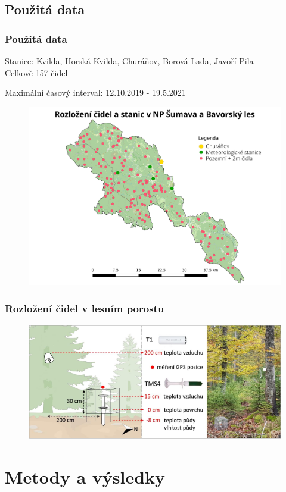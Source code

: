 \documentclass[
	11pt, %
]{beamer}
\begin{document}

\subsection{Použitá data}

\begin{frame}
	\frametitle{Použitá data}
	Stanice: Kvilda, Horská Kvilda, Churáňov, Borová Lada, Javoří Pila\\
	Celkově 157 čidel

	Maximální časový interval: 12.10.2019 - 19.5.2021
	\begin{figure}
		\includegraphics[width=0.7\linewidth]{rozlozenicidel.pdf}
	\end{figure}
\end{frame}

\begin{frame}
	\frametitle{Rozložení čidel v lesním porostu}
	\begin{figure}
		\includegraphics[width=0.9\linewidth]{sensor_closeup.png}
	\end{figure}
\end{frame}


\section{Metody a výsledky}
\end{document}
